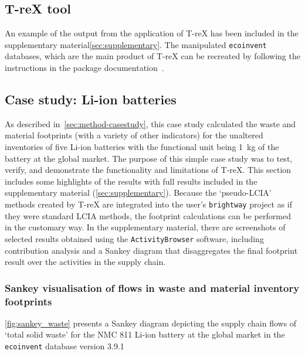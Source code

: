 \subsection{T-reX tool}\label{sec:results-T-reX}

An example of the output from the application of T-reX has been included in the supplementary material\autoref{sec:supplementary}. The manipulated \texttt{ecoinvent} databases, which are the main product of T-reX can be recreated by following the instructions in the package documentation~\citep{mcdowall2023T-reXdocs}.

\subsection{Case study: Li-ion batteries}\label{sec:results-casestudy}

As described in~\autoref{sec:method-casestudy}, this case study calculated the waste and material footprints (with a variety of other indicators) for the unaltered inventories of five Li-ion batteries with the functional unit being 1~kg of the battery at the global market. The purpose of this simple case study was to test, verify, and demonstrate the functionality and limitations of T-reX. This section includes some highlights of the results with full results included in the supplementary material (\autoref{sec:supplementary}). Because the `pseudo-LCIA' methods created by T-reX are integrated into the user's \texttt{brightway} project as if they were standard LCIA methods, the footprint calculations can be performed in the customary way. In the supplementary material, there are screenshots of selected results obtained using the \texttt{ActivityBrowser} software, including contribution analysis and a Sankey diagram that disaggregates the final footprint result over the activities in the supply chain.

\subsubsection{Sankey visualisation of flows in waste and material inventory footprints}\label{sec:results-case_study-sankey}

\autoref{fig:sankey_waste} presents a Sankey diagram depicting the supply chain flows of `total solid waste' for the NMC 811 Li-ion battery at the global market in the \texttt{ecoinvent} database version 3.9.1

